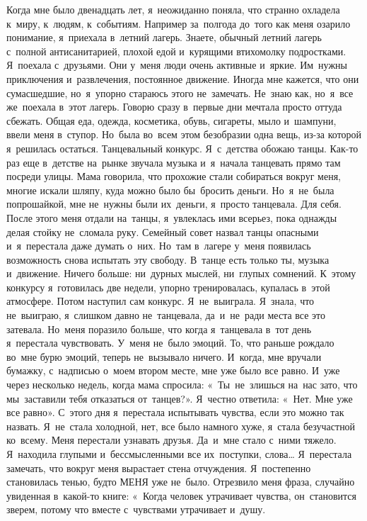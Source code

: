 Когда мне было двенадцать лет, я~неожиданно поняла, что странно охладела к~миру, к~людям, к~событиям.
Например за~полгода до~того как меня озарило понимание, я~приехала в~летний лагерь.
Знаете, обычный летний лагерь с~полной антисанитарией, плохой едой и~курящими втихомолку подростками.
Я~поехала с~друзьями.
Они у~меня люди очень активные и~яркие.
Им~нужны приключения и~развлечения, постоянное движение.
Иногда мне кажется, что они сумасшедшие, но~я~упорно стараюсь этого не~замечать.
Не~знаю как, но~я~все же~поехала в~этот лагерь.
Говорю сразу в~первые дни мечтала просто оттуда сбежать.
Общая еда, одежда, косметика, обувь, сигареты, мыло и~шампуни, ввели меня в~ступор.
Но~была во~всем этом безобразии одна вещь, из-за которой я~решилась остаться.
Танцевальный конкурс.
Я~с~детства обожаю танцы.
Как-то раз еще в~детстве на~рынке звучала музыка и~я~начала танцевать прямо там посреди улицы.
Мама говорила, что прохожие стали собираться вокруг меня, многие искали шляпу, куда можно было бы~бросить деньги.
Но~я~не~была попрошайкой, мне не~нужны были их~деньги, я~просто танцевала.
Для себя.
После этого меня отдали на~танцы, я~увлеклась ими всерьез, пока однажды делая стойку не~сломала руку.
Семейный совет назвал танцы опасными и~я~перестала даже думать о~них.
Но~там в~лагере у~меня появилась возможность снова испытать эту свободу.
В~танце есть только ты, музыка и~движение.
Ничего больше: ни~дурных мыслей, ни~глупых сомнений.
К~этому конкурсу я~готовилась две недели, упорно тренировалась, купалась в~этой атмосфере.
Потом наступил сам конкурс.
Я~не~выиграла.
Я~знала, что не~выиграю, я~слишком давно не~танцевала, да~и~не~ради места все это затевала.
Но~меня поразило больше, что когда я~танцевала в~тот день я~перестала чувствовать.
У~меня не~было эмоций.
То, что раньше рождало во~мне бурю эмоций, теперь не~вызывало ничего.
И~когда, мне вручали бумажку, с~надписью о~моем втором месте, мне уже было все равно.
И~уже через несколько недель, когда мама спросила: «~Ты~не~злишься на~нас зато, что мы~заставили тебя отказаться от~танцев?».
Я~честно ответила: «~Нет.
Мне уже все равно».
С~этого дня я~перестала испытывать чувства, если это можно так назвать.
Я~не~стала холодной, нет, все было намного хуже, я~стала безучастной ко~всему.
Меня перестали узнавать друзья.
Да~и~мне стало с~ними тяжело.
Я~находила глупыми и~бессмысленными все их~поступки, слова… Я~перестала замечать, что вокруг меня вырастает стена отчуждения.
Я~постепенно становилась тенью, будто МЕНЯ уже не~было.
Отрезвило меня фраза, случайно увиденная в~какой-то книге: «~Когда человек утрачивает чувства, он~становится зверем, потому что вместе с~чувствами утрачивает и~душу.
